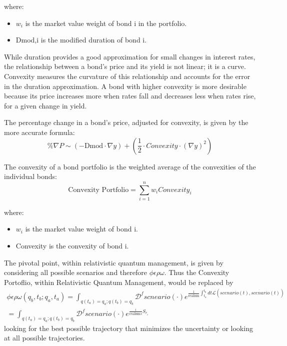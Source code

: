 \documentclass{article}
\begin{document}
where:
\begin{itemize}
\item $w_i$ is the market value weight of bond i in the portfolio.
\item Dmod,i is the modified duration of bond i.
\end{itemize}


While duration provides a good approximation for small changes in interest rates, the relationship between a bond's price and its yield is not linear; it is a curve. Convexity measures the curvature of this relationship and accounts for the error in the duration approximation. A bond with higher convexity is more desirable because its price increases more when rates fall and decreases less when rates rise, for a given change in yield.

The percentage change in a bond's price, adjusted for convexity, is given by the more accurate formula:
\begin{equation}
    \%\nabla P \sim (- \text{Dmod} \cdot \nabla y) + (\frac{1}{2} \cdot Convexity \cdot (\nabla y)^2)
\end{equation}


The convexity of a bond portfolio is the weighted average of the convexities of the individual bonds:
\begin{equation}
    \text{Convexity Portfolio} = \sum_{i=1}^n w_i Convexity_i
\end{equation}


where:
\begin{itemize}
\item $w_i$ is the market value weight of bond i.
\item Convexity is the convexity of bond i.
\end{itemize}

The pivotal point, within relativistic quantum management, is given by considering all possible scenarios and therefore $\phi \epsilon \rho \omega$.
Thus the Convexity Portoflio, within Relativistic Quantum Management, would be replaced by
\begin{align}
\phi\epsilon\rho\omega(q_b, t_b; q_a, t_a) = \int_{q(t_a)=q_a; q(t_b)=q_b} \mathcal{D}^f scneario(\cdot) e^{\frac{1}{\text{realism}} \int_{t_a}^{t_b} dt \mathcal{L}(scenario(t), \dot{scenario}(t))}\\ = \int_{q(t_a)=q_a; q(t_b)=q_b} \mathcal{D}^f scenario(\cdot) e^{\frac{i}{\text{realism}s} S_{r_i}} 
\end{align}
looking for the best possible trajectory that minimizes the uncertainty or looking at all possible trajectories.
\end{document}
